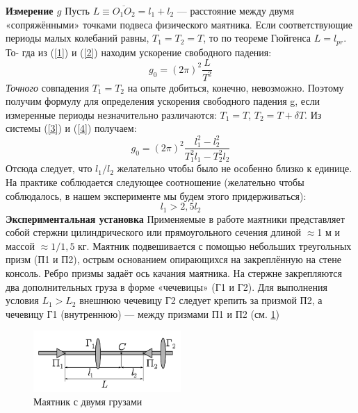 \documentclass[a4paper, 12pt]{article}
\begin{document}
\RaggedRight\textbf{Измерение $g$}
Пусть $L \equiv \overline{O_1 O_2} = l_1 + l_2$ — расстояние между двумя «сопряжёнными»
точками подвеса физического маятника. Если соответствующие периоды
малых колебаний равны, $T_1 = T_2 = T$, то по теореме Гюйгенса $L = l_{pr}$. То-
гда из (\ref{1}) и (\ref{2}) находим ускорение свободного падения:
\begin{equation}
    \label{8}
    g_0 = (2\pi)^2 \frac{L}{T^2}
\end{equation}
\textit{Точного} совпадения $T_1 = T_2$ на опыте добиться, конечно, невозможно.
Поэтому получим формулу для определения ускорения свободного падения g, если измеренные периоды незначительно различаются: $T_1 = T$, $T_2 = T + \delta{T}$. Из системы (\ref{3}) и (\ref{4}) получаем:
\begin{equation}
    \label{9}
    g_0 = (2\pi)^2 \frac{l_1^2 - l_2^2}{T_1^2l_1 - T_2^2l_2}
\end{equation}
Отсюда следует, что $l_1/l_2$ желательно чтобы было не особенно близко к единице. На практике соблюдается следующее соотношение (желательно чтобы соблюдалось, в нашем эксперименте мы будем этого придерживаться):
\begin{equation}
    \label{10}
    l_1 > 2,5l_2
\end{equation}
\newpage
\textbf{Экспериментальная установка} \newline
Применяемые в работе маятники представляет собой стержни цилиндрического или прямоугольного сечения длиной $\approx$1 м и массой $\approx 1/1,5$ кг. Маятник подвешивается с помощью небольших треугольных призм (П1 и П2), острым основанием опирающихся на закреплённую на стене консоль. Ребро призмы задаёт ось качания маятника. На стержне закрепляются два дополнительных груза в форме «чечевицы» (Г1 и Г2). Для выполнения условия $L_1 > L_2$ внешнюю чечевицу Г2 следует крепить за призмой П2, а чечевицу Г1 (внутреннюю) — между призмами П1 и П2 (см. \ref{ustan}) \newline
\begin{figure}[h!]
		\begin{center}
			\includegraphics[width = 0.5\textwidth]{3.png}
			\caption{Маятник с двумя грузами}
			\label{ustan}
		\end{center}
	\end{figure}
\end{document}
